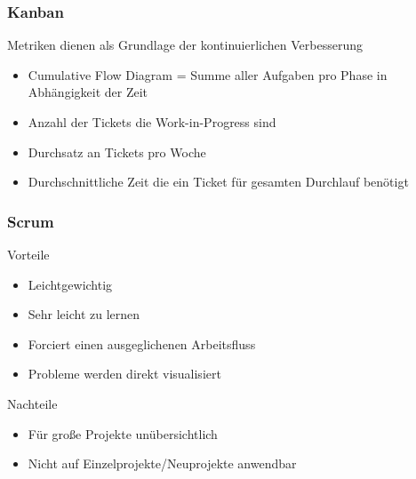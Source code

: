 \begin{frame}
\frametitle{Kanban}
	Metriken dienen als Grundlage der kontinuierlichen Verbesserung
	\begin{itemize}
		\item Cumulative Flow Diagram = Summe aller Aufgaben pro Phase in Abhängigkeit der Zeit
		\item Anzahl der Tickets die Work-in-Progress sind
		\item Durchsatz an Tickets pro Woche
		\item Durchschnittliche Zeit die ein Ticket für gesamten Durchlauf benötigt
	\end{itemize}
\end{frame}

\begin{frame}
\frametitle{Scrum}
	Vorteile
	\begin{itemize}
		\item Leichtgewichtig
		\item Sehr leicht zu lernen
		\item Forciert einen ausgeglichenen Arbeitsfluss
		\item Probleme werden direkt visualisiert
	\end{itemize}
	\bigskip
	Nachteile
	\begin{itemize}
		\item Für große Projekte unübersichtlich
		\item Nicht auf Einzelprojekte/Neuprojekte anwendbar
	\end{itemize}
\end{frame}
